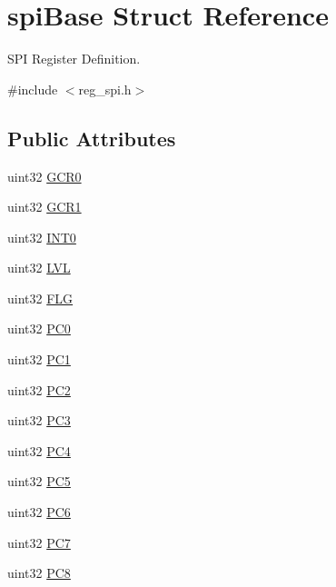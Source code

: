 \hypertarget{structspiBase}{}\section{spi\+Base Struct Reference}
\label{structspiBase}


S\+PI Register Definition.  




{\ttfamily \#include $<$reg\+\_\+spi.\+h$>$}

\subsection*{Public Attributes}
\begin{DoxyCompactItemize}
\item 
uint32 \mbox{\hyperlink{structspiBase_a673fb5de5c220d0f93e550c296a6b2a2}{G\+C\+R0}}
\item 
uint32 \mbox{\hyperlink{structspiBase_a453b9a97d6650d3e96f926ce9571a49b}{G\+C\+R1}}
\item 
uint32 \mbox{\hyperlink{structspiBase_a4d76cd9f7fa6c1d884367100952142f8}{I\+N\+T0}}
\item 
uint32 \mbox{\hyperlink{structspiBase_a0ab9168975f9cdc29c5a2b9593f03c92}{L\+VL}}
\item 
uint32 \mbox{\hyperlink{structspiBase_a7a70455043185d39dd2420c095dd926d}{F\+LG}}
\item 
uint32 \mbox{\hyperlink{structspiBase_ac4a15943ed2c2f7a798f20a257847e57}{P\+C0}}
\item 
uint32 \mbox{\hyperlink{structspiBase_aaac53456796e652368e8ea5f960db97c}{P\+C1}}
\item 
uint32 \mbox{\hyperlink{structspiBase_ae32622aa0d458542f4127b0ee49f82d3}{P\+C2}}
\item 
uint32 \mbox{\hyperlink{structspiBase_ab3340a489713a192e2727105e62f77a7}{P\+C3}}
\item 
uint32 \mbox{\hyperlink{structspiBase_af4789d94b534fcc8a3fafaf0a67de60c}{P\+C4}}
\item 
uint32 \mbox{\hyperlink{structspiBase_a546bed69939f177f83f0d43a1720a12a}{P\+C5}}
\item 
uint32 \mbox{\hyperlink{structspiBase_a69d2b3f0b489e1e1d97230ee5d7d7b85}{P\+C6}}
\item 
uint32 \mbox{\hyperlink{structspiBase_a0414297155cff5dc698890c298895515}{P\+C7}}
\item 
uint32 \mbox{\hyperlink{structspiBase_a05b2ba057d7d9faadaba337aabae5040}{P\+C8}}
\item 

\end{DoxyCompactItemize}
